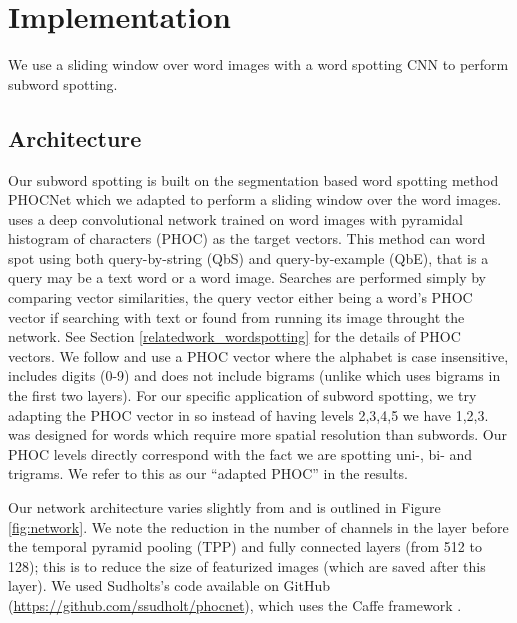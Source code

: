 \documentclass[ms,electronic,twosidetoc,letterpaper,chaptercenter,parttop,lof,lot]{byumsphd}
\begin{document}
\section{Implementation}

We use a sliding window over word images with a word spotting CNN to perform subword spotting.

\subsection{Architecture}

Our subword spotting is built on the segmentation based word spotting method PHOCNet \cite{sudholt2016, sudholt2017} which we adapted to perform a sliding window over the word images. \cite{sudholt2017} uses a deep convolutional network trained on word images with pyramidal histogram of characters (PHOC) \cite{Almazan2014} as the target vectors. This method can word spot using both query-by-string (QbS) and query-by-example (QbE), that is a query may be a text word or a word image. Searches are performed simply by comparing vector similarities, the query vector either being a word's PHOC vector if searching with text or found from running its image throught the network. See Section \ref{relatedwork_wordspotting} for the details of PHOC vectors. We follow \cite{sudholt2017} and use a PHOC vector where the alphabet is case insensitive, includes digits (0-9) and does not include bigrams (unlike \cite{Almazan2014} which uses bigrams in the first two layers). For our specific application of subword spotting, we try adapting the PHOC vector in \cite{sudholt2017} so instead of having levels 2,3,4,5 we have 1,2,3. \cite{sudholt2017} was designed for words which require more spatial resolution than subwords. Our PHOC levels directly correspond with the fact we are spotting uni-, bi- and trigrams. We refer to this as our ``adapted PHOC'' in the results.



Our network architecture varies slightly from \cite{sudholt2017} and is outlined in Figure \ref{fig:network}. We note the reduction in the number of channels in the layer before the temporal pyramid pooling (TPP) and fully connected layers (from 512 to 128); this is to reduce the size of featurized images (which are saved after this layer).  We used Sudholts's code available on GitHub (\url{https://github.com/ssudholt/phocnet}), which uses the Caffe framework \cite{caffe}.

\end{document}
